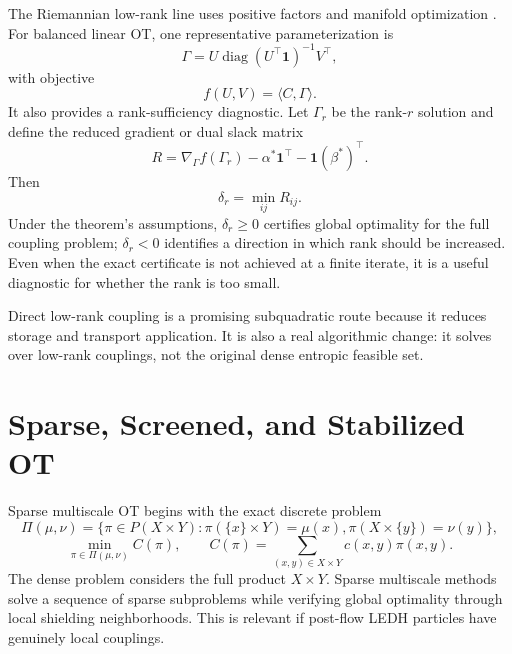 \documentclass[11pt]{article}
\newcommand{\ones}{\mathbf{1}}
\newcommand{\diag}{\operatorname{diag}}
\begin{document}
The Riemannian low-rank line uses positive factors and manifold optimization
\citep{jawanpuria2026riemannian}.  For balanced linear OT, one representative
parameterization is
\begin{equation}
\Gamma
=
U\diag(U^\top\ones)^{-1}V^\top,
\label{eq:riemannian-coupling}
\end{equation}
with objective
\begin{equation}
f(U,V)=\langle C,\Gamma\rangle.
\label{eq:riemannian-objective}
\end{equation}
It also provides a rank-sufficiency diagnostic.  Let $\Gamma_r$ be the rank-$r$
solution and define the reduced gradient or dual slack matrix
\begin{equation}
R
=
\nabla_\Gamma f(\Gamma_r)
-\alpha^\ast\ones^\top
-\ones(\beta^\ast)^\top.
\label{eq:rank-slack}
\end{equation}
Then
\begin{equation}
\delta_r=\min_{ij}R_{ij}.
\label{eq:rank-certificate}
\end{equation}
Under the theorem's assumptions, $\delta_r\ge0$ certifies global optimality for
the full coupling problem; $\delta_r<0$ identifies a direction in which rank
should be increased.  Even when the exact certificate is not achieved at a
finite iterate, it is a useful diagnostic for whether the rank is too small.

Direct low-rank coupling is a promising subquadratic route because it reduces
storage and transport application.  It is also a real algorithmic change: it
solves over low-rank couplings, not the original dense entropic feasible set.

\section{Sparse, Screened, and Stabilized OT}

Sparse multiscale OT begins with the exact discrete problem
\citep{schmitzer2016sparse}
\begin{equation}
\Pi(\mu,\nu)
=
\{\pi\in P(X\times Y):
\pi(\{x\}\times Y)=\mu(x),
\pi(X\times\{y\})=\nu(y)\},
\label{eq:sparse-polytope}
\end{equation}
\begin{equation}
\min_{\pi\in\Pi(\mu,\nu)}
C(\pi),
\qquad
C(\pi)=\sum_{(x,y)\in X\times Y}c(x,y)\pi(x,y).
\label{eq:sparse-ot}
\end{equation}
The dense problem considers the full product $X\times Y$.  Sparse multiscale
methods solve a sequence of sparse subproblems while verifying global
optimality through local shielding neighborhoods.  This is relevant if
post-flow LEDH particles have genuinely local couplings.
\end{document}
